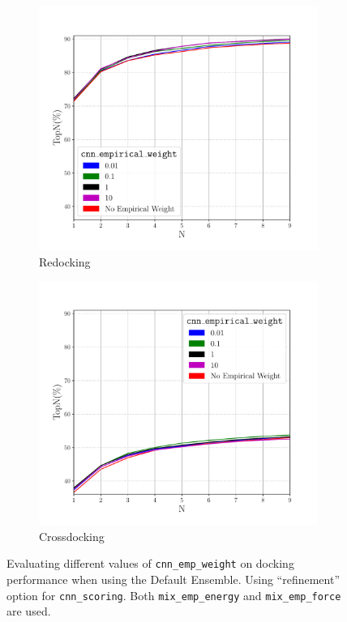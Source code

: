 \documentclass[journal=jcisd8,manuscript=article]{achemso}
\begin{document}
\begin{figure}    
        \begin{subfigure}[b]{0.48\textwidth}    
		\centering
		\includegraphics[width=\textwidth]{figures/redocking/refine_sweep_cnn_empirical_weight_line.pdf}
		\caption{Redocking}
		\label{fig:CNNEmpWeightRD}
        \end{subfigure}    
        \begin{subfigure}[b]{0.48\textwidth}    
		\centering
		\includegraphics[width=\textwidth]{figures/crossdocking/refine_sweep_cnn_empirical_weight_line.pdf}
		\caption{Crossdocking}
		\label{fig:CNNEmpWeightCD}
        \end{subfigure}    
	\caption{Evaluating different values of \texttt{cnn\_emp\_weight} on docking performance when using the Default Ensemble. Using ``refinement'' option for \texttt{cnn\_scoring}. Both \texttt{mix\_emp\_energy} and \texttt{mix\_emp\_force} are used.}
	\label{fig:CNNEmpWeight}
\end{figure} 
\end{document}

